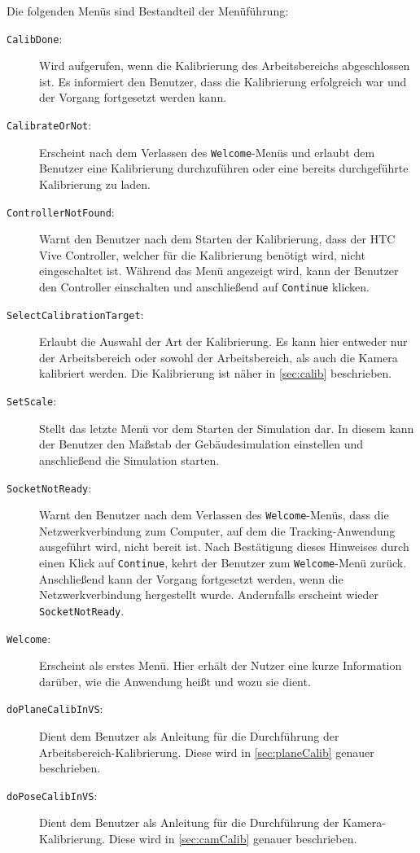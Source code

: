 Die folgenden Menüs sind Bestandteil der Menüführung:
\begin{description}
	\item[\texttt{CalibDone}:] Wird aufgerufen, wenn die Kalibrierung des Arbeitsbereichs abgeschlossen ist. Es informiert den Benutzer, dass die Kalibrierung erfolgreich war und der Vorgang fortgesetzt werden kann.
	\item[\texttt{CalibrateOrNot}:] Erscheint nach dem Verlassen des \texttt{Welcome}-Menüs und erlaubt dem Benutzer eine Kalibrierung durchzuführen oder eine bereits durchgeführte Kalibrierung zu laden.
	\item[\texttt{ControllerNotFound}:] Warnt den Benutzer nach dem Starten der Kalibrierung, dass der HTC Vive Controller, welcher für die Kalibrierung benötigt wird, nicht eingeschaltet ist. Während das Menü angezeigt wird, kann der Benutzer den Controller einschalten und anschließend auf \texttt{Continue} klicken.
	\item[\texttt{SelectCalibrationTarget}:] Erlaubt die Auswahl der Art der Kalibrierung. Es kann hier entweder nur der Arbeitsbereich oder sowohl der Arbeitsbereich, als auch die Kamera kalibriert werden. Die Kalibrierung ist näher in \ref{sec:calib} beschrieben.
	\item[\texttt{SetScale}:] Stellt das letzte Menü vor dem Starten der Simulation dar. In diesem kann der Benutzer den Maßstab der Gebäudesimulation einstellen und anschließend die Simulation starten.
	\item[\texttt{SocketNotReady}:] Warnt den Benutzer nach dem Verlassen des \texttt{Welcome}-Menüs, dass die Netzwerkverbindung zum Computer, auf dem die Tracking-Anwendung ausgeführt wird, nicht bereit ist. Nach Bestätigung dieses Hinweises durch einen Klick auf \texttt{Continue}, kehrt der Benutzer zum \texttt{Welcome}-Menü zurück. Anschließend kann der Vorgang fortgesetzt werden, wenn die Netzwerkverbindung hergestellt wurde. Andernfalls erscheint wieder \texttt{SocketNotReady}.
	\item[\texttt{Welcome}:] Erscheint als erstes Menü. Hier erhält der Nutzer eine kurze Information darüber, wie die Anwendung heißt und wozu sie dient.
	\item[\texttt{doPlaneCalibInVS}:] Dient dem Benutzer als Anleitung für die Durchführung der Arbeitsbereich-Kalibrierung. Diese wird in \ref{sec:planeCalib} genauer beschrieben.
	\item[\texttt{doPoseCalibInVS}:] Dient dem Benutzer als Anleitung für die Durchführung der Kamera-Kalibrierung. Diese wird in \ref{sec:camCalib} genauer beschrieben.
\end{description}

